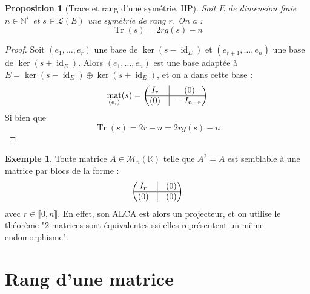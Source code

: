 \documentclass[french]{book}
\newcommand{\N}{\mathbb{N}}
\newcommand{\K}{\mathbb{K}}
\newcommand{\st}{^\star}
\theoremstyle{plain}
\newtheorem{prop}{Proposition}[chapter]
\theoremstyle{definition}
\newtheorem{exa}{Exemple}[chapter]
\theoremstyle{remark}
\DeclareMathOperator{\id}{id}
\DeclareMathOperator{\tr}{Tr}
\DeclareMathOperator{\mat}{mat}
\begin{document}
\begin{prop}[Trace et rang d'une symétrie, HP]
	Soit $E$ de dimension finie $n\in\N\st$ et $s\in\mathcal{L}(E)$ une symétrie de rang $r$. On a : $$\tr(s)=2rg(s)-n$$
\end{prop}
\begin{proof}
	Soit $(e_1,\ldots,e_r)$ une base de $\ker(s-\id_E)$ et $(e_{r+1},\ldots,e_n)$ une base de $\ker(s+\id_E)$. Alors $(e_1,\ldots,e_n)$ est une base adaptée à $E=\ker(s-\id_E)\oplus\ker(s+\id_E)$, et on a dans cette base : $$\mat_{(e_i)}(s)=\begin{pmatrix}I_r&\vline&(0)\\ \hline (0)&\vline&-I_{n-r}\end{pmatrix}$$ Si bien que $$\tr(s)=2r-n=2rg(s)-n$$
\end{proof}
\begin{exa}
	Toute matrice $A\in\mathcal{M}_n(\K)$ telle que $A^2=A$ est semblable à une matrice par blocs de la forme : $$\begin{pmatrix}I_r&\vline&(0)\\ \hline (0)&\vline&(0)\end{pmatrix}$$ avec $r\in\llbracket0,n\rrbracket$. En effet, son ALCA est alors un projecteur, et on utilise le théorème "2 matrices sont équivalentes ssi elles représentent un même endomorphisme".
\end{exa}
\section{Rang d'une matrice}
\end{document}
